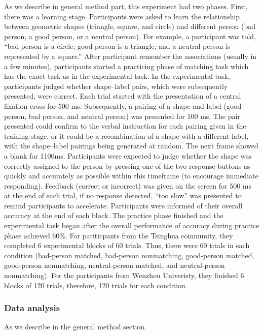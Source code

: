 \documentclass[man]{apa6}
\begin{document}
As we describe in general method part, this experiment had two phases. First, there was a learning stage. Participants were asked to learn the relationship between geometric shapes (triangle, square, and circle) and different person (bad person, a good person, or a neutral person). For example, a participant was told, \enquote{bad person is a circle; good person is a triangle; and a neutral person is represented by a square.} After participant remember the associations (usually in a few minutes), participants started a practicing phase of matching task which has the exact task as in the experimental task.
In the experimental task, participants judged whether shape--label pairs, which were subsequently presented, were correct. Each trial started with the presentation of a central fixation cross for 500 ms. Subsequently, a pairing of a shape and label (good person, bad person, and neutral person) was presented for 100 ms. The pair presented could confirm to the verbal instruction for each pairing given in the training stage, or it could be a recombination of a shape with a different label, with the shape--label pairings being generated at random. The next frame showed a blank for 1100ms. Participants were expected to judge whether the shape was correctly assigned to the person by pressing one of the two response buttons as quickly and accurately as possible within this timeframe (to encourage immediate responding). Feedback (correct or incorrect) was given on the screen for 500 ms at the end of each trial, if no response detected, \enquote{too slow} was presented to remind participants to accelerate. Participants were informed of their overall accuracy at the end of each block. The practice phase finished and the experimental task began after the overall performance of accuracy during practice phase achieved 60\%.
For pariticpants from the Tsinghua community, they completed 6 experimental blocks of 60 trials. Thus, there were 60 trials in each condition (bad-person matched, bad-person nonmatching, good-person matched, good-person nonmatching, neutral-person matched, and neutral-person nonmatching). For the participants from Wenzhou Univeristy, they finished 6 blocks of 120 trials, therefore, 120 trials for each condition.

\hypertarget{data-analysis}{%
\subsubsection{Data analysis}\label{data-analysis}}

As we describe in the general method section.
\end{document}
